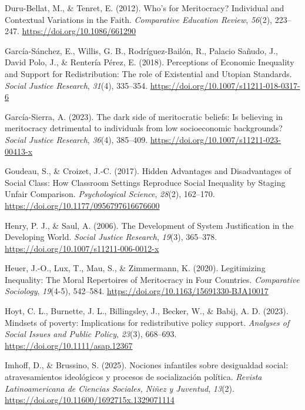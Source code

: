 \documentclass[
  13pt,
]{article}
\newlength{\cslhangindent}
\newenvironment{CSLReferences}[2] %
 {\begin{list}{}{%
  \setlength{\itemindent}{0pt}
  \setlength{\leftmargin}{0pt}
  \setlength{\parsep}{0pt}
  \ifodd #1
   \setlength{\leftmargin}{\cslhangindent}
   \setlength{\itemindent}{-1\cslhangindent}
  \fi
  \setlength{\itemsep}{#2\baselineskip}}}
 {\end{list}}
\begin{document}
\begin{CSLReferences}{1}{0}
Duru-Bellat, M., \& Tenret, E. (2012). Who's for {Meritocracy}?
{Individual} and {Contextual Variations} in the {Faith}.
\emph{Comparative Education Review}, \emph{56}(2), 223--247.
\url{https://doi.org/10.1086/661290}

García-Sánchez, E., Willis, G. B., Rodríguez-Bailón, R., Palacio Sañudo,
J., David Polo, J., \& Rentería Pérez, E. (2018). Perceptions of
{Economic Inequality} and {Support} for {Redistribution}: {The} role of
{Existential} and {Utopian Standards}. \emph{Social Justice Research},
\emph{31}(4), 335--354. \url{https://doi.org/10.1007/s11211-018-0317-6}

García-Sierra, A. (2023). The dark side of meritocratic beliefs: {Is}
believing in meritocracy detrimental to individuals from low
socioeconomic backgrounds? \emph{Social Justice Research}, \emph{36}(4),
385--409. \url{https://doi.org/10.1007/s11211-023-00413-x}

Goudeau, S., \& Croizet, J.-C. (2017). Hidden {Advantages} and
{Disadvantages} of {Social Class}: {How Classroom Settings Reproduce
Social Inequality} by {Staging Unfair Comparison}. \emph{Psychological
Science}, \emph{28}(2), 162--170.
\url{https://doi.org/10.1177/0956797616676600}

Henry, P. J., \& Saul, A. (2006). The {Development} of {System
Justification} in the {Developing World}. \emph{Social Justice
Research}, \emph{19}(3), 365--378.
\url{https://doi.org/10.1007/s11211-006-0012-x}

Heuer, J.-O., Lux, T., Mau, S., \& Zimmermann, K. (2020). Legitimizing
{Inequality}: {The Moral Repertoires} of {Meritocracy} in {Four
Countries}. \emph{Comparative Sociology}, \emph{19}(4-5), 542--584.
\url{https://doi.org/10.1163/15691330-BJA10017}

Hoyt, C. L., Burnette, J. L., Billingsley, J., Becker, W., \& Babij, A.
D. (2023). Mindsets of poverty: {Implications} for redistributive policy
support. \emph{Analyses of Social Issues and Public Policy},
\emph{23}(3), 668--693. \url{https://doi.org/10.1111/asap.12367}

Imhoff, D., \& Brussino, S. (2025). {Nociones infantiles sobre
desigualdad social: atravesamientos ideológicos y procesos de
socialización política}. \emph{Revista Latinoamericana de Ciencias
Sociales, Niñez y Juventud}, \emph{13}(2).
\url{https://doi.org/10.11600/1692715x.1329071114}


\end{CSLReferences}
\end{document}
